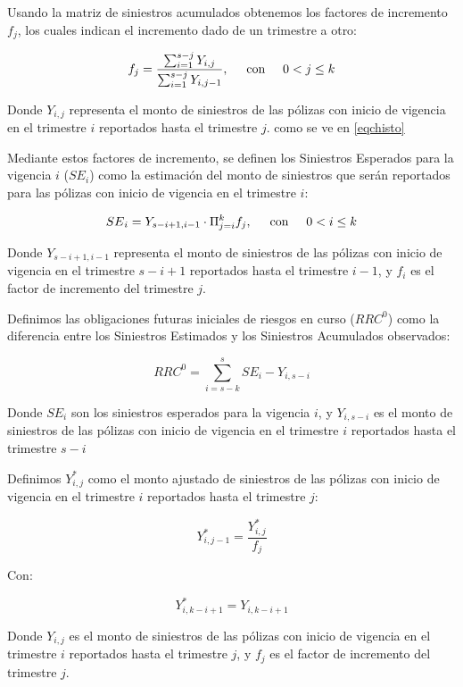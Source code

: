 \documentclass[11pt,twoside,openright,spanish]{report}
\numberwithin{equation}{chapter}
\numberwithin{figure}{chapter}
\numberwithin{table}{chapter}
\begin{document}
	Usando la matriz de siniestros acumulados obtenemos los factores de incremento ${f}_{j}$, los cuales indican el incremento dado de un trimestre a otro:

	\begin{equation}
	{f}_{j}=\frac{\sum _{i=1}^{s-j}{Y}_{i,j}}{\sum _{i=1}^{s-j}{Y}_{i,j-1}}, \hspace{0.5cm}\text{con}\hspace{0.5cm} 0< j\le k
	\label{eqchisto}
	\end{equation}

	Donde ${Y}_{i,j}$ representa el monto de siniestros de las pólizas con inicio de vigencia en el trimestre $i$ reportados hasta el trimestre $j$. como se ve en \eqref{eqchisto}

	Mediante estos factores de incremento, se definen los Siniestros Esperados para la vigencia $i$ (${SE}_{i}$) como la estimación del monto de siniestros que serán reportados para las pólizas con inicio de vigencia en el trimestre $i$:
	
	$${SE}_{i}={Y}_{s-i+1,i-1}\cdot\Pi_{j=i}^{k}{f}_{j},\hspace{0.5cm}\text{con}\hspace{0.5cm}0< i\le k$$
	

	Donde ${Y}_{s-i+1,i-1}$ representa el monto de siniestros de las pólizas con inicio de vigencia en el trimestre $s-i+1$ reportados hasta el trimestre $i-1$, y ${f}_{i}$ es el factor de incremento del trimestre $j$. 

	Definimos las obligaciones futuras iniciales de riesgos en curso (${RRC}^{0}$) como la diferencia entre los Siniestros Estimados y los Siniestros Acumulados observados:
	
	$${RRC}^{0}=\sum _{i=s-k}^{s}{SE}_{i}-{Y}_{i,s-i}$$ 

	Donde ${SE}_{i}$ son los siniestros esperados para la vigencia $i$, y ${Y}_{i,s-i}$ es el monto de siniestros de las pólizas con inicio de vigencia en el trimestre $i$ reportados hasta el trimestre $s-i$
		 
	Definimos ${Y}_{i,j}^{*}$ como el monto ajustado de siniestros de las pólizas con inicio de vigencia en el trimestre $i$ reportados hasta el trimestre $j$:
	
	$${Y}_{i,j-1}^{*}=\frac{{Y}_{i,j}^{*}}{{f}_{j}}$$

	Con:

	$${Y}_{i,k-i+1}^{*}={Y}_{i,k-i+1}$$	

	Donde ${Y}_{i,j}$ es el monto de siniestros de las pólizas con inicio de vigencia en el trimestre $i$ reportados hasta el trimestre $j$, y ${f}_{j}$ es el factor de incremento del trimestre $j$.
\end{document}
